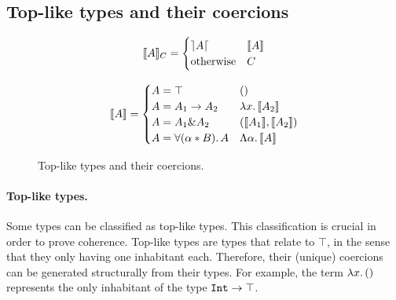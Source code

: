 \subsection{Top-like types and their coercions}
\begin{figure}[!t]
\begin{spacing}{1}
\begin{minipage}[t]{.5\textwidth}
  \begin{center} 
  \[
  \llbracket A \rrbracket_{C} = 
  \begin{cases} 
        \rceil A \lceil & \llbracket A \rrbracket \\ 
        \text{otherwise} & {C} 
  \end{cases}
  \]
  \end{center}
\end{minipage}
\begin{minipage}[t]{.5\textwidth}

  \[
  \llbracket A \rrbracket = 
  \begin{cases} 
        A = \top & () \\
        A = A_1 \to A_2 & \lambda x.\, \llbracket A_2 \rrbracket \\
        A = A_1 \& A_2 & (\llbracket A_1 \rrbracket, \llbracket A_2 \rrbracket) \\
        A = \forall (\alpha * B).\, A & \Lambda \alpha.\, \llbracket A \rrbracket
  \end{cases}
  \]
\end{minipage}
\end{spacing}
  \caption{Top-like types and their coercions.}
  \label{fig:andcoercion}
\end{figure}
\paragraph{Top-like types.}
Some \name types can be classified as top-like types.
This classification is crucial in order to prove coherence.
Top-like types are types that relate to $\top$, in the sense that they
only having one inhabitant each.
Therefore, their (unique) coercions can be generated structurally from their types. 
For example, the term $\lambda x.\, ()$ represents the only inhabitant of the type 
$\texttt{Int} \to \top$.


